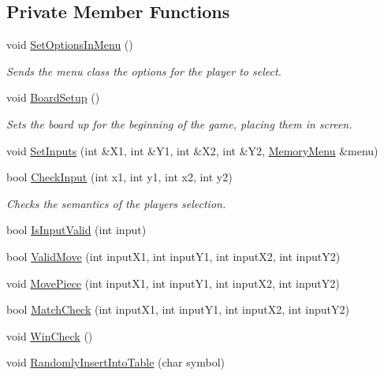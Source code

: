 \subsection*{Private Member Functions}
\begin{DoxyCompactItemize}
\item 
void \hyperlink{classMemoryMatch_a62548d6cf028d372c08cc01a0693edb2}{Set\-Options\-In\-Menu} ()
\begin{DoxyCompactList}\small\item\em Sends the menu class the options for the player to select. \end{DoxyCompactList}\item 
void \hyperlink{classMemoryMatch_a1e3b9172bdd0fb69f0360bb28acee65c}{Board\-Setup} ()
\begin{DoxyCompactList}\small\item\em Sets the board up for the beginning of the game, placing them in screen. \end{DoxyCompactList}\item 
void \hyperlink{classMemoryMatch_a026870bd184e56fc576c1ec85f64b487}{Set\-Inputs} (int \&X1, int \&Y1, int \&X2, int \&Y2, \hyperlink{classMemoryMenu}{Memory\-Menu} \&menu)
\item 
bool \hyperlink{classMemoryMatch_a64f64d28f47e59f3303addf70ca136e2}{Check\-Input} (int x1, int y1, int x2, int y2)
\begin{DoxyCompactList}\small\item\em Checks the semantics of the players selection. \end{DoxyCompactList}\item 
bool \hyperlink{classMemoryMatch_a8d0683346a26c1d00c818e9b75b5a412}{Is\-Input\-Valid} (int input)
\item 
bool \hyperlink{classMemoryMatch_ae5f190c71bc1a63ec95eab6fd8a3c2c7}{Valid\-Move} (int input\-X1, int input\-Y1, int input\-X2, int input\-Y2)
\item 
void \hyperlink{classMemoryMatch_a68e81f3e7ed13385f430da0bc938d7e9}{Move\-Piece} (int input\-X1, int input\-Y1, int input\-X2, int input\-Y2)
\item 
bool \hyperlink{classMemoryMatch_a7a83e4a378bb74a729d495d9a8896248}{Match\-Check} (int input\-X1, int input\-Y1, int input\-X2, int input\-Y2)
\item 
void \hyperlink{classMemoryMatch_a1c958b2c366188c2c603c562b3f2f878}{Win\-Check} ()
\item 
void \hyperlink{classMemoryMatch_a61158d799b281be3607860233899b405}{Randomly\-Insert\-Into\-Table} (char symbol)

\end{DoxyCompactItemize}
